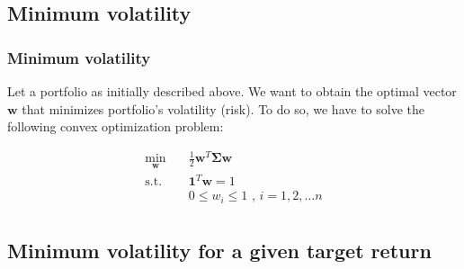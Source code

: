 \documentclass{beamer}
\begin{document}
\subsection{Minimum volatility}

\begin{frame}
\frametitle{\textbf{Minimum volatility}}

\justifying
Let a portfolio as initially described above. We want to obtain the optimal vector $\mathbf{w}$ that minimizes portfolio's volatility (risk). To do so, we have to solve the following convex optimization problem:

\vspace{0.2cm}
\justifying
\begin{equation}
\begin{aligned}
\label{eq:1}
\min_{\mathbf{w}} \quad & \frac{1}{2}\mathbf{w}^{T}\mathbf{\Sigma}\mathbf{w} \\
\textrm{s.t.} \quad & \mathbf{1}^{T} \mathbf{w} = 1 \\
                             & 0 \leq w_{i} \leq 1 \textrm{ , } i = 1, 2, \dots n \\
\end{aligned}
\end{equation}

\end{frame}





\subsection{Minimum volatility for a given target return}
\end{document}
